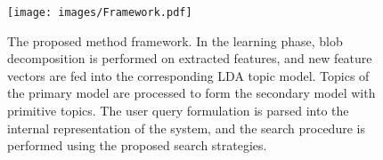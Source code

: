 %
\begin{figure}[!t]
  \centering
  \texttt{[image: images/Framework.pdf]}
\caption{The proposed method framework. In the learning phase, blob decomposition is performed on extracted features, and new feature vectors are fed into the corresponding LDA topic model. Topics of the primary model are processed to form the secondary model with primitive topics.  The user query formulation is parsed into the internal representation of the system, and the search procedure is performed using the proposed search strategies.}
\label{fig:framework}
\end{figure}
%